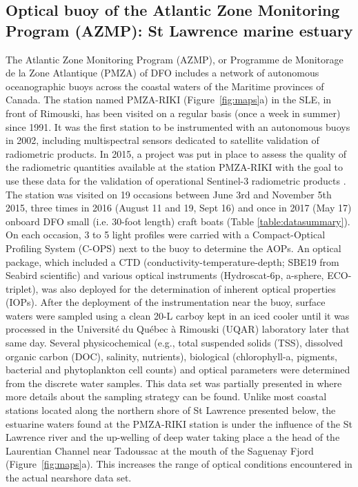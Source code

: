\documentclass[essd, manuscript]{copernicus}
\begin{document}
\subsection{Optical buoy of the Atlantic Zone Monitoring Program (AZMP): St Lawrence marine estuary}
The Atlantic Zone Monitoring Program (AZMP), or Programme de Monitorage de la Zone Atlantique (PMZA) of DFO includes a network of autonomous oceanographic buoys across the coastal waters of the Maritime provinces of Canada. The station named PMZA-RIKI (Figure~\ref{fig:maps}a) in the SLE, in front of Rimouski, has been visited on a regular basis (once a week in summer) since 1991. It was the first station to be instrumented with an autonomous buoys in 2002, including multispectral sensors dedicated to satellite validation of radiometric products. In 2015, a project was put in place to assess the quality of the radiometric quantities available at the station PMZA-RIKI with the goal to use these data for the validation of operational Sentinel-3 radiometric products \citep{Belanger2017}. The station was visited on 19 occasions between June 3rd and November 5th 2015, three times in 2016 (August 11 and 19, Sept 16) and once in 2017 (May 17) onboard DFO small (i.e. 30-foot length) craft boats (Table \ref{table:datasummary}).  On each occasion, 3 to 5 light profiles were carried with a Compact-Optical Profiling System (C-OPS) next to the buoy to determine the AOPs. An optical package, which included a CTD (conductivity-temperature-depth; SBE19 from Seabird scientific) and various optical instruments (Hydroscat-6p, a-sphere, ECO-triplet), was also deployed for the determination of inherent optical properties (IOPs). After the deployment of the instrumentation near the buoy, surface waters were sampled using a clean 20-L carboy kept in an iced cooler until it was processed in the Université du Québec à Rimouski (UQAR) laboratory later that same day. Several physicochemical (e.g., total suspended solids (TSS), dissolved organic carbon (DOC), salinity, nutrients), biological (chlorophyll-a, pigments, bacterial and phytoplankton cell counts) and optical parameters were determined from the discrete water samples. This data set was partially presented in \citet{Belanger2017} where more details about the sampling strategy can be found. Unlike most coastal stations located along the northern shore of St Lawrence presented below, the estuarine waters found at the PMZA-RIKI station is under the influence of the St Lawrence river and the up-welling of deep water taking place a the head of the Laurentian Channel near Tadoussac at the mouth of the Saguenay Fjord (Figure~\ref{fig:maps}a). This increases the range of optical conditions encountered in the actual nearshore data set.   
 
\end{document}
